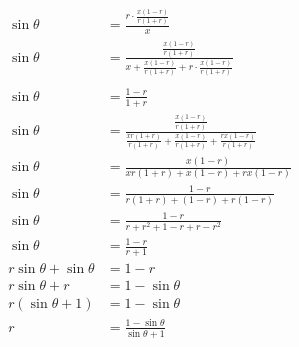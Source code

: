 \documentclass{article}
\begin{document}
\begin{minipage}[t]{0.56\linewidth}
\setlength{\abovedisplayskip}{0pt}
\begin{align*}
	\sin\theta&=\frac{r\cdot\frac{x(1-r)}{r(1+r)}}{x} \\
	\sin\theta&=\frac{\frac{x(1-r)}{r(1+r)}}
		{x+\frac{x(1-r)}{r(1+r)}+r\cdot\frac{x(1-r)}{r(1+r)}} \\
	\\
	\sin\theta&=\frac{1-r}{1+r} \\
	\sin\theta&=\frac{\frac{x(1-r)}{r(1+r)}}{\frac{xr(1+r)}
		{r(1+r)}+\frac{x(1-r)}{r(1+r)}+\frac{rx(1-r)}{r(1+r)}} \\
	\sin\theta&=\frac{x(1-r)}{xr(1+r)+x(1-r)+rx(1-r)} \\
	\sin\theta&=\frac{1-r}{r(1+r)+(1-r)+r(1-r)} \\
	\sin\theta&=\frac{1-r}{r+r^2+1-r+r-r^2} \\
	\sin\theta&=\frac{1-r}{r+1} \\
	r\sin\theta+\sin\theta&=1-r \\
	r\sin\theta+r&=1-\sin\theta \\
	r(\sin\theta+1)&=1-\sin\theta \\
	r&=\frac{1-\sin\theta}{\sin\theta+1}
\end{align*}
\end{minipage}
\end{document}
